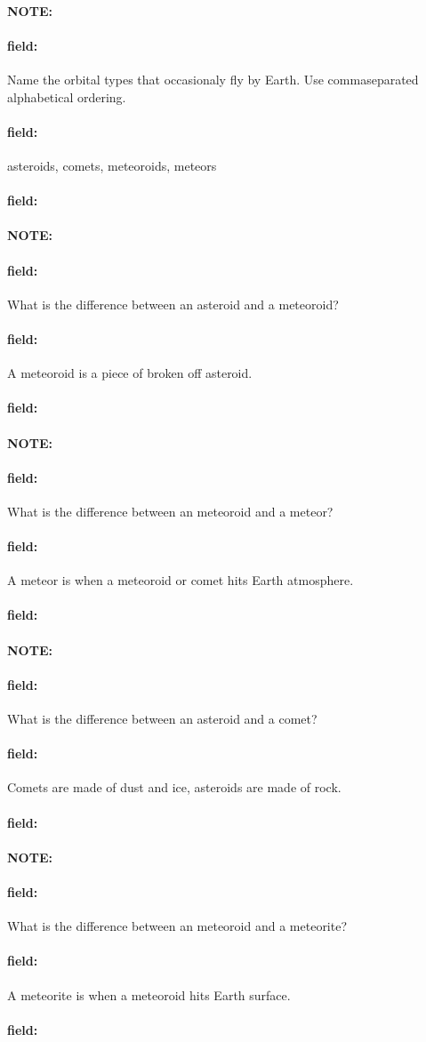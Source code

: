 \documentclass[12pt]{article}
\newenvironment{note}{\paragraph{NOTE:}}{}
\newenvironment{field}{\paragraph{field:}}{}
\begin{document}
\begin{note}
   \begin{field}
       Name the orbital types that occasionaly fly by Earth. Use commaseparated alphabetical ordering.
   \end{field}
   \begin{field}
		asteroids, comets, meteoroids, meteors
   \end{field}
   \begin{field}
   \end{field}
\end{note}
\begin{note}
   \begin{field}
       What is the difference between an asteroid and a meteoroid?
   \end{field}
   \begin{field}
		A meteoroid is a piece of broken off asteroid.
   \end{field}
   \begin{field}
   \end{field}
\end{note}
\begin{note}
   \begin{field}
       What is the difference between an meteoroid and a meteor?
   \end{field}
   \begin{field}
		A meteor is when a meteoroid or comet hits Earth atmosphere.
   \end{field}
   \begin{field}
   \end{field}
\end{note}
\begin{note}
   \begin{field}
       What is the difference between an asteroid and a comet?
   \end{field}
   \begin{field}
		Comets are made of dust and ice, asteroids are made of rock.
   \end{field}
   \begin{field}
   \end{field}
\end{note}
\begin{note}
   \begin{field}
       What is the difference between an meteoroid and a meteorite?
   \end{field}
   \begin{field}
		A meteorite is when a meteoroid hits Earth surface.
   \end{field}
   \begin{field}
   \end{field}
\end{note}
\end{document}
